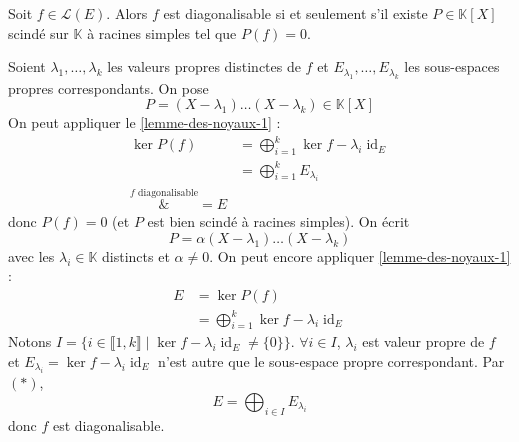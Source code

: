 	\begin{application}
		Soit $f \in \mathcal{L}(E)$. Alors $f$ est diagonalisable si et seulement s'il existe $P \in \mathbb{K}[X]$ scindé sur $\mathbb{K}$ à racines simples tel que $P(f) = 0$.
	\end{application}

	\begin{demonstration}
		 Soient $\lambda_1, \dots, \lambda_k$ les valeurs propres distinctes de $f$ et $E_{\lambda_1}, \dots, E_{\lambda_k}$ les sous-espaces propres correspondants. On pose
		\[ P = (X-\lambda_1) \dots (X-\lambda_k) \in \mathbb{K}[X] \]
		On peut appliquer le \cref{lemme-des-noyaux-1} :
		\begin{align*}
			\ker{P(f)} &= \bigoplus_{i = 1}^k \ker{f - \lambda_i \operatorname{id}_E} \\
			&= \bigoplus_{i = 1}^k E_{\lambda_i} \\
			\overset{f \text{ diagonalisable}}&{=} E
		\end{align*}
		donc $P(f) = 0$ (et $P$ est bien scindé à racines simples).
		\newpar
		 On écrit
		\[ P = \alpha (X-\lambda_1) \dots (X-\lambda_k) \]
		avec les $\lambda_i \in \mathbb{K}$ distincts et $\alpha \neq 0$. On peut encore appliquer \cref{lemme-des-noyaux-1} :
		\begin{align*}
			E &= \ker{P(f)} \\
			&= \bigoplus_{i = 1}^k \ker{f - \lambda_i \operatorname{id}_E} \tag{*}
		\end{align*}
		Notons $I = \{ i \in \llbracket 1, k \rrbracket \mid \ker{f - \lambda_i \operatorname{id}_E} \neq \{ 0 \} \}$. $\forall i \in I$, $\lambda_i$ est valeur propre de $f$ et $E_{\lambda_i} = \ker{f - \lambda_i \operatorname{id}_E}$ n'est autre que le sous-espace propre correspondant. Par $(*)$,
		\[ E = \bigoplus_{i \in I} E_{\lambda_i} \]
		donc $f$ est diagonalisable.
	\end{demonstration}

